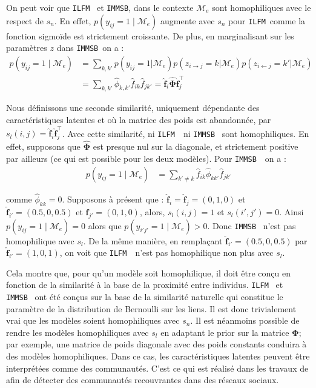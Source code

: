 \documentclass[french]{hermes-journal}
\newcommand{\ilfm}{\texttt{ILFM}}
\newcommand{\immsb}{\texttt{IMMSB}}
\newcommand{\pr}{p}
\newcommand{\M}{\mathcal{M}}
\newcommand{\mat}[1]{\bm{#1}}
\begin{document}
On peut voir que \ilfm~  et \immsb, dans le contexte $\mathcal{M}_e$ sont homophiliques avec le respect de $s_n$. En effet, $\pr(y_{ij}=1 \mid \mathcal{M}_e)$ augmente avec $s_n$  pour  \ilfm\ comme la fonction sigmoïde est strictement croissante. De plus, en marginalisant sur les paramètres $z$ dans \immsb\ on a :
\begin{align}
    \pr(y_{ij} =1 \mid \mathcal{M}_e) & = \sum_{k,k'} \pr(y_{ij}=1|\mathcal{M}_e) \pr(z_{i \rightarrow j}=k | \mathcal{M}_e) \pr(z_{i \leftarrow j}=k' | \mathcal{M}_e) \nonumber \\
& = \sum_{k,k'} \hat{\phi}_{k,k'} \hat{f}_{ik} \hat{f}_{jk'} = \mat{\hat{f}}_{i} \mat{\hat{\Phi}} \mat{\hat{f}}_j^\top \nonumber
\end{align}


Nous définissons une seconde similarité, uniquement dépendante des caractéristiques latentes et où la matrice des poids est abandonnée, par $s_l(i,j) = \mat{\hat{f}}_{i} \mat{\hat{f}}_j^\top$. Avec cette similarité, ni \ilfm~ ni \immsb~ sont homophiliques. En effet, supposons que $\mat{\hat{\Phi}}$ est presque nul sur la diagonale, et strictement positive par ailleurs (ce qui est possible pour les deux modèles). Pour \immsb~ on a :
\begin{align*} 
\pr(y_{ij}=1 \mid \M_e) & = \sum_{k' \neq k} \hat{f}_{ik} \hat{\phi}_{kk'} \hat{f}_{jk'}
\end{align*}


comme $\hat{\phi}_{kk} = 0$.  Supposons à présent que : $\mat{\hat{f}}_i=\mat{\hat{f}}_j=(0,1,0)$ et $\mat{\hat{f}}_{i'}=(0.5,0,0.5)$ et $\mat{\hat{f}}_{j'}=(0,1,0)$, alors, $s_l(i,j)=1$ et $s_l(i',j')=0$. Ainsi $\pr(y_{ij}=1 \mid \M_e) = 0$ alors que $\pr(y_{i'j'}=1 \mid \M_e) > 0$. Donc \immsb~ n'est pas homophilique avec $s_l$. De la même manière, en remplaçant $\mat{\hat{f}}_{i'}=(0.5,0,0. 5)$ par $\mat{\hat{f}}_{i'}=(1,0,1)$, on voit que \ilfm~ n'est pas homophilique non plus avec $s_l$.

Cela montre que, pour qu'un modèle soit homophilique, il doit être conçu en fonction de la similarité à la base de la proximité entre individus. \ilfm~ et \immsb~ ont été conçus sur la base de la similarité naturelle qui constitue le paramètre de la distribution de Bernoulli sur les liens. Il est donc trivialement vrai que les modèles soient homophiliques avec $s_n$. Il est néanmoins possible de rendre les modèles homophiliques avec $s_l$ en adaptant le prior sur la matrice $\mat{\Phi}$; par exemple, une matrice de poids diagonale avec des poids constants conduira à des modèles homophiliques. Dans ce cas, les caractéristiques latentes peuvent être interprétées comme des communautés. C'est ce qui est réalisé dans les travaux de \cite{AMMSB} afin de détecter des communautés recouvrantes dans des réseaux sociaux.
\end{document}
